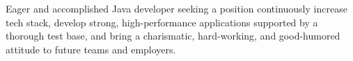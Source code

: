 

\begin{cvparagraph}
Eager and accomplished Java developer seeking a position continuously increase tech stack, develop strong, high-performance applications supported by a thorough test base, and bring a charismatic, hard-working, and good-humored attitude to future teams and employers.
\end{cvparagraph}